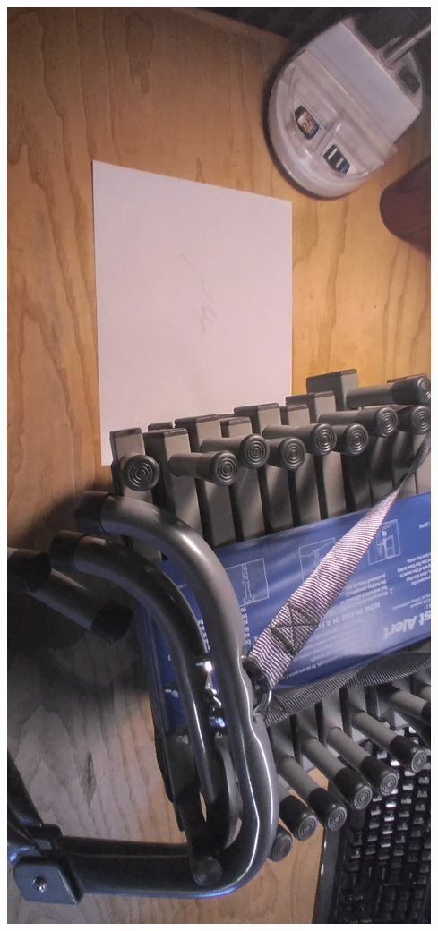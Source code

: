 \documentclass{article}
\begin{document}
\begin{enumerate}
\begin{center}
            \includegraphics[max width=\textwidth - 6ex]{rope_ladder}
        \end{center}

\end{enumerate}
\end{document}
